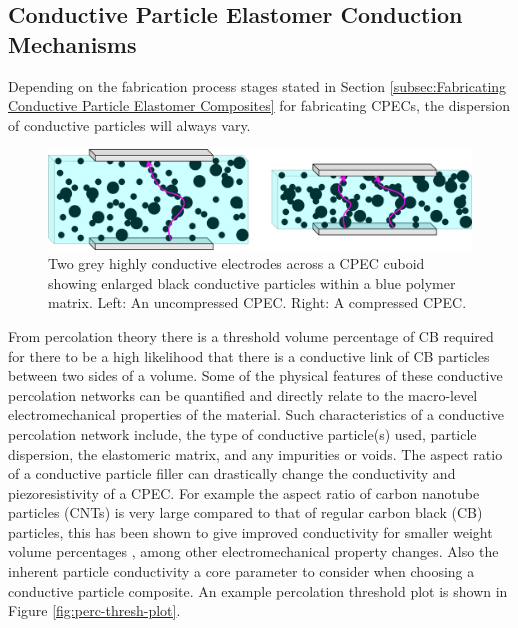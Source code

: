 \subsection{Conductive Particle Elastomer Conduction Mechanisms}
Depending on the fabrication process stages stated in Section \ref{subsec:Fabricating Conductive Particle Elastomer Composites} for fabricating CPECs, the dispersion of conductive particles will always vary. 

\begin{figure}[H]
    \centering
    \includegraphics[width=0.7\linewidth]{Figures/res_deformed_states_x2_crop.jpg}
    \caption{Two grey highly conductive electrodes across a CPEC cuboid showing enlarged black conductive particles within a blue polymer matrix. Left: An uncompressed CPEC. Right: A compressed CPEC.}
    \label{fig:res_deformed_cube}
\end{figure}

From percolation theory \cite{Spahr2017} there is a threshold volume percentage of CB required for there to be a high likelihood that there is a conductive link of CB particles between two sides of a volume. Some of the physical features of these conductive percolation networks can be quantified and directly relate to the macro-level electromechanical properties of the material. Such characteristics of a conductive percolation network include, the type of conductive particle(s) used, particle dispersion, the elastomeric matrix, and any impurities or voids. The aspect ratio of a conductive particle filler can drastically change the conductivity and piezoresistivity of a CPEC. For example the aspect ratio of carbon nanotube particles (CNTs) is very large compared to that of regular carbon black (CB) particles, this has been shown to give improved conductivity for smaller weight volume percentages \cite{Wu2019,Flandin1999}, among other electromechanical property changes. Also the inherent particle conductivity a core parameter to consider when choosing a conductive particle composite. An example percolation threshold plot is shown in Figure \ref{fig:perc-thresh-plot}.

